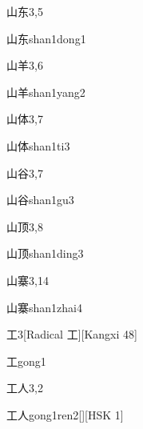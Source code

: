 \begin{entry}{山东}{3,5}
  \begin{phonetics}{山东}{shan1dong1}
  \end{phonetics}
\end{entry}

\begin{entry}{山羊}{3,6}
  \begin{phonetics}{山羊}{shan1yang2}
  \end{phonetics}
\end{entry}

\begin{entry}{山体}{3,7}
  \begin{phonetics}{山体}{shan1ti3}
  \end{phonetics}
\end{entry}

\begin{entry}{山谷}{3,7}
  \begin{phonetics}{山谷}{shan1gu3}
  \end{phonetics}
\end{entry}

\begin{entry}{山顶}{3,8}
  \begin{phonetics}{山顶}{shan1ding3}
  \end{phonetics}
\end{entry}

\begin{entry}{山寨}{3,14}
  \begin{phonetics}{山寨}{shan1zhai4}
  \end{phonetics}
\end{entry}

\begin{entry}{工}{3}[Radical 工][Kangxi 48]
  \begin{phonetics}{工}{gong1}
  \end{phonetics}
\end{entry}

\begin{entry}{工人}{3,2}
  \begin{phonetics}{工人}{gong1ren2}[][HSK 1]
  \end{phonetics}
\end{entry}

